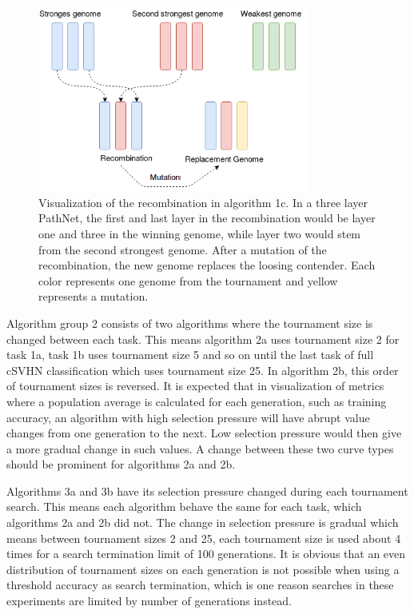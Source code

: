 \begin{figure}[h]
    \centering
    \includegraphics[width=0.8\textwidth]{Chapters/Experiments/search_algo/figures/Recombination_algorithm.png}
    \caption{Visualization of the recombination in algorithm 1c. In a three layer PathNet, the first and last layer in the recombination would be layer one and three in the winning genome, while layer two would stem from the second strongest genome. After a mutation of the recombination, the new genome replaces the loosing contender. Each color represents one genome from the tournament and yellow represents a mutation.}
    \label{fig:search.recombination_algorithm}
\end{figure}

Algorithm group 2 consists of two algorithms where the tournament size is changed between each task. This means algorithm 2a uses tournament size 2 for task 1a, task 1b uses tournament size 5 and so on until the last task of full cSVHN classification which uses tournament size 25. In algorithm 2b, this order of tournament sizes is reversed. It is expected that in visualization of metrics where a population average is calculated for each generation, such as training accuracy, an algorithm with high selection pressure will have abrupt value changes from one generation to the next. Low selection pressure would then give a more gradual change in such values. A change between these two curve types should be prominent for algorithms 2a and 2b.

Algorithms 3a and 3b have its selection pressure changed during each tournament search. This means each algorithm behave the same for each task, which algorithms 2a and 2b did not. The change in selection pressure is gradual which means between tournament sizes 2 and 25, each tournament size is used about 4 times for a search termination limit of 100 generations. It is obvious that an even distribution of tournament sizes on each generation is not possible when using a threshold accuracy as search termination, which is one reason searches in these experiments are limited by number of generations instead. 

